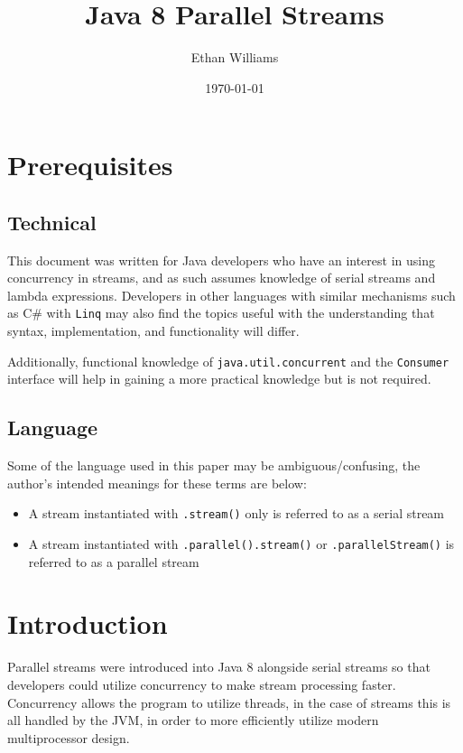 \documentclass[oneside, a4paper, 11pt]{article}
\begin{document}
\title{Java 8 Parallel Streams}
\author{Ethan Williams}
\date{\today}
\maketitle

\tableofcontents


\setcounter{section}{-1}
\section{Prerequisites}
\subsection{Technical}
This document was written for Java developers who have an interest in using concurrency in streams, and as such assumes knowledge of serial streams and lambda expressions. Developers in other languages with similar mechanisms such as C\# with \verb|Linq| may also find the topics useful with the understanding that syntax, implementation, and functionality will differ.

Additionally, functional knowledge of \verb|java.util.concurrent| and the \verb|Consumer| interface will help in gaining a more practical knowledge but is not required.
\subsection{Language} \label{language}
Some of the language used in this paper may be ambiguous/confusing, the author's intended meanings for these terms are below:
\begin{itemize}
\item A stream instantiated with \verb|.stream()| only is referred to as a serial stream
\item A stream instantiated with \verb|.parallel().stream()| or \verb|.parallelStream()| is referred to as a parallel stream
\end{itemize}
\section{Introduction} %
Parallel streams were introduced into Java 8 alongside serial streams so that developers could utilize concurrency to make stream processing faster.  Concurrency allows the program to utilize threads, in the case of streams this is all handled by the JVM, in order to more efficiently utilize modern multiprocessor design.
\end{document}
